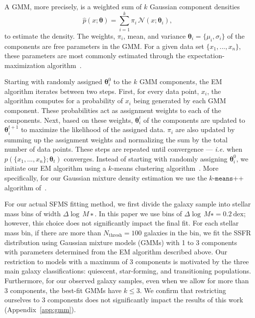 \documentclass[preprint2,tighten]{aastex62}
\begin{document}
A GMM, more precisely, is a weighted sum of $k$ Gaussian component densities 
\begin{equation} \label{eq:gmm}
\hat{p}(x;\bm{\theta}) = \sum\limits_{i=1}^{k} \pi_i \, \mathcal{N}(x; \bm{\theta}_i),
\end{equation}
to estimate the density. The weights, $\pi_i$, mean, and variance  
$\bm{\theta}_i=\{\mu_i, \sigma_i\}$ 
of the components are free parameters in the GMM. For a given data set 
$\{x_1, ..., x_n\}$, these parameters are most commonly estimated through
the expectation-maximization algorithm~\citep[EM;]{dempster1977,neal1998}. 

Starting with randomly assigned $\bm{\theta}_{i}^0$ to the $k$ GMM components, 
the EM algorithm iterates between two steps. First, for every data point, 
$x_i$, the algorithm computes for a probability of $x_i$ being generated by 
each GMM component. These probabilities act as assignment weights to each of
the components. Next, based on these weights, $\bm{\theta}_i^t$ of the components 
are updated to $\bm{\theta}_i^{t+1}$ to maximize the likelihood of the assigned 
data. $\pi_i$ are also updated by summing up the assignment weights and 
normalizing the sum by the total number of data points. These steps are 
repeated until convergence --- \emph{i.e.} when $p(\{x_1, ..., x_n\} ; \bm{\theta}_t)$ 
converges. Instead of starting with randomly assigning $\bm{\theta}_{i}^0$, 
we initiate our EM algorithm using a $k$-means clustering algorithm~\citep{lloyd1982}.
More specifically, for our Gaussian mixture density estimation we use 
the $k$-$\mathtt{means}$++ algorithm of~\cite{arthur2007}. 

For our actual SFMS fitting method, we first divide the galaxy 
sample into stellar mass bins of width $\Delta \log\,M∗$. In 
this paper we use bins of $\Delta \log\,M∗ = 0.2\  \mathrm{dex}$; however, 
this choice does not significantly impact the final fit. For each stellar 
mass bin, if there are more than $N_\mathrm{thresh}=100$ galaxies in the bin, 
we fit the SSFR distribution using Gaussian mixture models (GMMs) 
with 1 to 3 components with parameters determined from the EM algorithm 
described above. Our restriction to models with a maximum of 3 components 
is motivated by the three main galaxy classifications: quiescent, 
star-forming, and transitioning populations. Furthermore, for our observed 
galaxy samples, even when we allow for more than 3 components, 
the best-fit GMMs have $k\leq3$. We confirm that restricting ourselves 
to 3 components does not significantly impact the results of this work
(Appendix~\ref{app:gmm}). 
\end{document}
